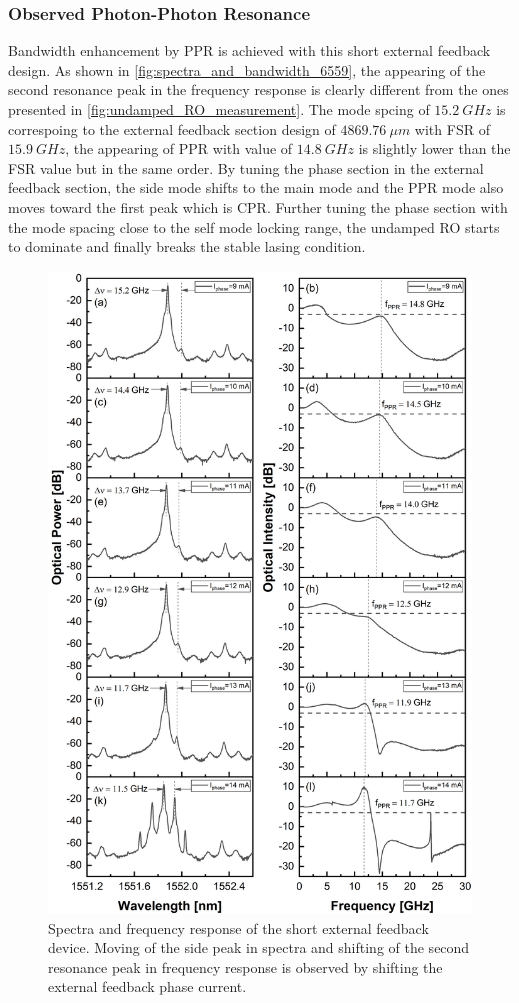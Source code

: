 \subsubsection{Observed Photon-Photon Resonance} \label{subsubsec:observed_PPR}
Bandwidth enhancement by PPR is achieved with this short external feedback design. As shown in \autoref{fig:spectra_and_bandwidth_6559}, the appearing of the second resonance peak in the frequency response is clearly different from the ones presented in \autoref{fig:undamped_RO_measurement}. The mode spcing of $15.2 \ GHz$ is correspoing to the external feedback section design of $4869.76 \ \mu m$ with FSR of $15.9 \ GHz$, the appearing of PPR with value of $14.8 \ GHz$ is slightly lower than the FSR value but in the same order. By tuning the phase section in the external feedback section, the side mode shifts to the main mode and the PPR mode also moves toward the first peak which is CPR. Further tuning the phase section with the mode spacing close to the self mode locking range, the undamped RO starts to dominate and finally breaks the stable lasing condition.

\begin{figure}[H]
    \centering
    \includegraphics[width=.9\linewidth]{figures/spectra_and_bandwidth_6559.png}
    \caption{Spectra and frequency response of the short external feedback device. Moving of the side peak in spectra and shifting of the second resonance peak in frequency response is observed by shifting the external feedback phase current.}
    \label{fig:spectra_and_bandwidth_6559}
\end{figure}

